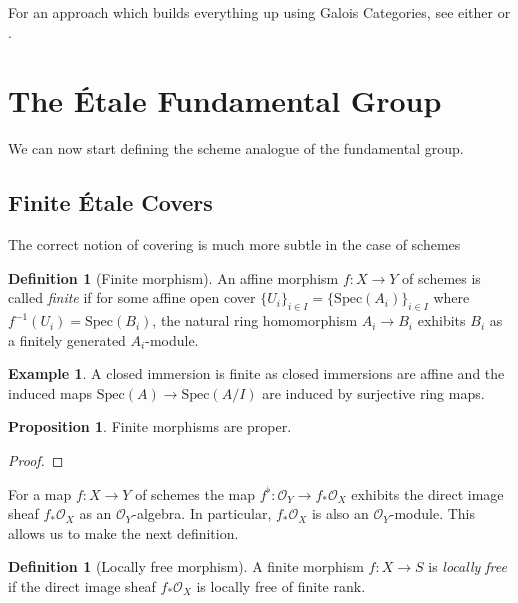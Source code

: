 \documentclass{article}
\theoremstyle{definition}
\newtheorem{proposition}[theorem]{Proposition}
\newtheorem{definition}[theorem]{Definition}
\newtheorem{example}[theorem]{Example}
\theoremstyle{remark}
\newcommand{\mc}[1]{\mathcal{#1}}
\begin{document}

For an approach which builds everything up using Galois Categories, see either \cite{grothendieck} or \cite{Lenstra}.


\section{The \'Etale Fundamental Group}

We can now start defining the scheme analogue of the fundamental group. 
\subsection{Finite \'Etale Covers}
The correct notion of covering is much more subtle in the case of schemes 
\begin{definition}[Finite morphism]
	An affine morphism $f: X \to Y$ of schemes is called \textit{finite} if for some affine open cover $\{U_i\}_{i \in I}  = \{\text{Spec}(A_i)\}_{i \in I}$ where $f^{-1}(U_i) = \text{Spec}(B_i)$, the natural ring homomorphism $A_i \to B_i$ exhibits $B_i$ as a finitely generated $A_i$-module.
\end{definition}

\begin{example}
	A closed immersion is finite as closed immersions are affine and the induced maps $\text{Spec}(A) \to \text{Spec}(A/I)$ are induced by surjective ring maps.
\end{example}

\begin{proposition}
	Finite morphisms are proper.
\end{proposition}
\begin{proof}
\end{proof}

For a map $f: X \to Y$ of schemes the map $f^{\flat}: \mc{O}_Y \to f_*\mc{O}_X$ exhibits the direct image sheaf $f_* \mc{O}_X$ as an $\mc{O}_Y$-algebra.
In particular, $f_* \mc{O}_X$ is also an $\mc{O}_Y$-module.
This allows us to make the next definition.

\begin{definition}[Locally free morphism]	
	A finite morphism $f: X \to S$ is \textit{locally free} if the direct image sheaf $f_* \mc{O}_X$ is locally free of finite rank.   
\end{definition}
\end{document}
